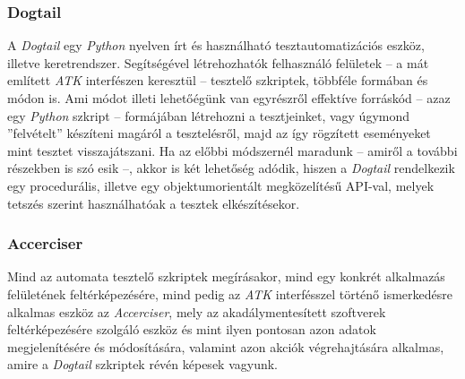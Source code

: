 \subsubsection{Dogtail}

A \textit{Dogtail} egy \textit{Python} nyelven írt és használható tesztautomatizációs eszköz, illetve keretrendszer. Segítségével létrehozhatók felhasználó felületek -- a mát említett \textit{ATK} interfészen keresztül -- tesztelő szkriptek, többféle formában és módon is. Ami módot illeti lehetőégünk van egyrészről effektíve forráskód -- azaz egy \textit{Python} szkript -- formájában létrehozni a tesztjeinket, vagy úgymond ''felvételt'' készíteni magáról a tesztelésről, majd az így rögzített eseményeket mint tesztet visszajátszani. Ha az előbbi módszernél maradunk -- amiről a további részekben is szó esik --, akkor is két lehetőség adódik, hiszen a \textit{Dogtail} rendelkezik egy procedurális, illetve egy objektumorientált megközelítésű API-val, melyek tetszés szerint használhatóak a tesztek elkészítésekor.

\subsubsection{Accerciser}

Mind az automata tesztelő szkriptek megírásakor, mind egy konkrét alkalmazás felületének feltérképezésére, mind pedig az \textit{ATK} interfésszel történő ismerkedésre alkalmas eszköz az \textit{Accerciser}, mely az akadálymentesített szoftverek feltérképezésére szolgáló eszköz és mint ilyen pontosan azon adatok megjelenítésére és módosítására, valamint azon akciók végrehajtására alkalmas, amire a \textit{Dogtail} szkriptek révén képesek vagyunk.
